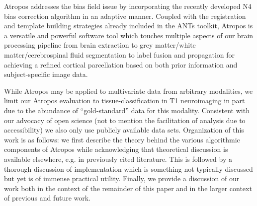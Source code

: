 \documentclass[11pt,english]{article}
\begin{document}
Atropos addresses the bias field issue by incorporating the recently developed N4 bias correction algorithm \citep{Tustison2010} in an adaptive manner.  Coupled with the registration \citep{Avants2010b} and template building strategies \citep{Avants2010} already included in the ANTs toolkit,   
Atropos is a versatile and powerful software tool which touches multiple aspects of our brain processing pipeline from brain extraction \citep{Avants2010a} to grey matter/white matter/cerebrospinal fluid segmentation to label fusion and propagation for achieving a refined cortical parcellation based on both prior information and subject-specific image data.  

While Atropos may be applied to multivariate data from arbitrary
modalities, we limit our Atropos evaluation to tissue-classification
in T1 neuroimaging in part due to the abundance of ``gold-standard''
data for this modality.  Consistent with our advocacy of open science
(not to mention the facilitation of analysis due to accessibility) we
also only use publicly available data sets.  Organization of this work
is as follows: we first describe the theory behind the various
algorithmic components of Atropos while acknowledging that theoretical
discussion is available elsewhere, e.g. in previously cited
literature.  This is followed by a thorough discussion of
implementation which is something not typically discussed but yet is
of immense practical utility.  Finally, we provide a discussion of our work both in the
context of the remainder of this paper and in the larger context of
previous and future work.






\end{document}
